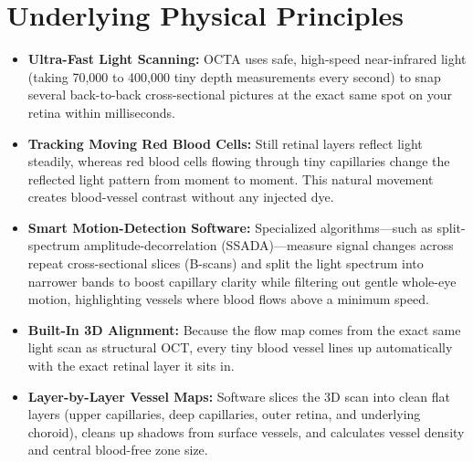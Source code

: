 \section{Underlying Physical Principles}
\begin{itemize}
\item \textbf{Ultra-Fast Light Scanning:} OCTA uses safe, high-speed near-infrared light (taking 70,000 to 400,000 tiny depth measurements every second) to snap several back-to-back cross-sectional pictures at the exact same spot on your retina within milliseconds.
\item \textbf{Tracking Moving Red Blood Cells:} Still retinal layers reflect light steadily, whereas red blood cells flowing through tiny capillaries change the reflected light pattern from moment to moment. This natural movement creates blood-vessel contrast without any injected dye.
\item \textbf{Smart Motion-Detection Software:} Specialized algorithms---such as split-spectrum amplitude-decorrelation (SSADA)---measure signal changes across repeat cross-sectional slices (B-scans) and split the light spectrum into narrower bands to boost capillary clarity while filtering out gentle whole-eye motion, highlighting vessels where blood flows above a minimum speed.
\item \textbf{Built-In 3D Alignment:} Because the flow map comes from the exact same light scan as structural OCT, every tiny blood vessel lines up automatically with the exact retinal layer it sits in.
\item \textbf{Layer-by-Layer Vessel Maps:} Software slices the 3D scan into clean flat layers (upper capillaries, deep capillaries, outer retina, and underlying choroid), cleans up shadows from surface vessels, and calculates vessel density and central blood-free zone size.
\end{itemize}

